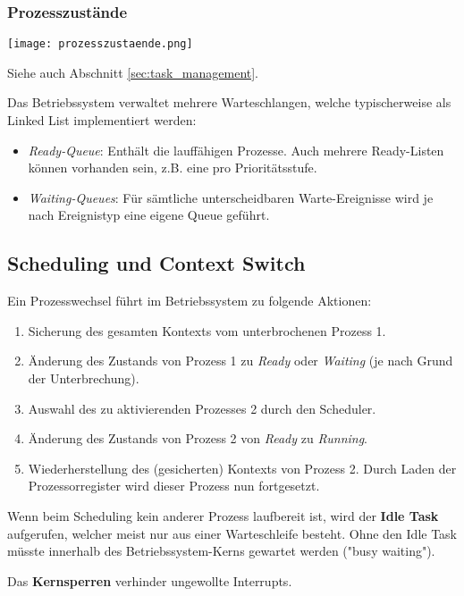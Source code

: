 \subsubsection{Prozesszustände}

\texttt{[image: prozesszustaende.png]}

Siehe auch Abschnitt \ref{sec:task_management}.

Das Betriebssystem verwaltet mehrere Warteschlangen, welche typischerweise als Linked List implementiert werden:

\begin{itemize}
	\itemsep-.5em
	\item \textit{Ready-Queue}: Enthält die lauffähigen Prozesse. Auch mehrere Ready-Listen können vorhanden sein, z.B. eine pro Prioritätsstufe.
	\item \textit{Waiting-Queues}: Für sämtliche unterscheidbaren Warte-Ereignisse wird je nach Ereignistyp eine eigene Queue geführt.
\end{itemize}


\subsection{Scheduling und Context Switch}

Ein Prozesswechsel führt im Betriebssystem zu folgende Aktionen:

\begin{enumerate}
	\itemsep-.5em 
	\item Sicherung des gesamten Kontexts vom unterbrochenen Prozess 1.
	\item Änderung des Zustands von Prozess 1 zu \textit{Ready} oder \textit{Waiting} (je nach Grund der Unterbrechung).
	\item Auswahl des zu aktivierenden Prozesses 2 durch den Scheduler.
	\item Änderung des Zustands von Prozess 2 von \textit{Ready} zu \textit{Running}.
	\item Wiederherstellung des (gesicherten) Kontexts von Prozess 2. Durch Laden der Prozessorregister wird dieser Prozess nun fortgesetzt.
\end{enumerate}

Wenn beim Scheduling kein anderer Prozess laufbereit ist, wird der \textbf{Idle Task} aufgerufen, welcher meist nur aus einer Warteschleife besteht.
Ohne den Idle Task müsste innerhalb des Betriebssystem-Kerns gewartet werden ("busy waiting").

Das \textbf{Kernsperren} verhinder ungewollte Interrupts.

